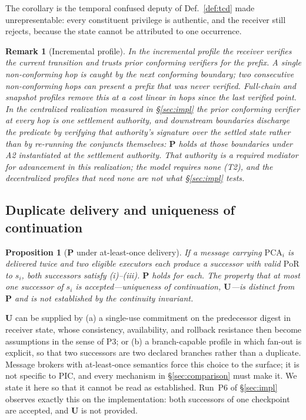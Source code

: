 \documentclass[conference]{IEEEtran}
\newcommand{\PoR}{\mathrm{PoR}}
\newtheorem{proposition}{Proposition}
\newtheorem{remark}{Remark}
\begin{document}
The corollary is the temporal confused deputy of Def.~\ref{def:tcd} made unrepresentable: every constituent privilege is authentic, and the receiver still rejects, because the state cannot be attributed to one occurrence.

\begin{remark}[Incremental profile]
In the incremental profile the receiver verifies the current transition and trusts prior conforming verifiers for the prefix. A single non-conforming hop is caught by the next conforming boundary; two consecutive non-conforming hops can present a prefix that was never verified. Full-chain and snapshot profiles remove this at a cost linear in hops since the last verified point. In the centralized realization measured in \S\ref{sec:impl} the prior conforming verifier at every hop is one settlement authority, and downstream boundaries discharge the predicate by verifying that authority's signature over the settled state rather than by re-running the conjuncts themselves: $\mathbf{P}$ holds at those boundaries under A2 instantiated at the settlement authority. That authority is a required mediator for advancement in this realization; the model requires none (T2), and the decentralized profiles that need none are not what \S\ref{sec:impl} tests.
\end{remark}

\subsection{Duplicate delivery and uniqueness of continuation}

\begin{proposition}[$\mathbf{P}$ under at-least-once delivery]\label{prop:dup}
If a message carrying $\mathrm{PCA}_i$ is delivered twice and two eligible executors each produce a successor with valid $\PoR$ to $s_i$, both successors satisfy (i)--(iii). $\mathbf{P}$ holds for each. The property that at most one successor of $s_i$ is accepted---\emph{uniqueness of continuation}, $\mathbf{U}$---is distinct from $\mathbf{P}$ and is not established by the continuity invariant.
\end{proposition}

$\mathbf{U}$ can be supplied by (a) a single-use commitment on the predecessor digest in receiver state, whose consistency, availability, and rollback resistance then become assumptions in the sense of P3; or (b) a branch-capable profile in which fan-out is explicit, so that two successors are two declared branches rather than a duplicate. Message brokers with at-least-once semantics force this choice to the surface; it is not specific to PIC, and every mechanism in \S\ref{sec:comparison} must make it. We state it here so that it cannot be read as established. Run~P6 of \S\ref{sec:impl} observes exactly this on the implementation: both successors of one checkpoint are accepted, and $\mathbf{U}$ is not provided.
\end{document}
